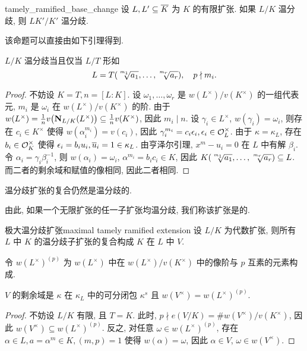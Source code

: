 \begin{proposition}{}{tamely_ramified_base_change}
设 $L,L'\subseteq \overline K$ 为 $K$ 的有限扩张. 如果 $L/K$ 温分歧, 则 $LK'/K'$ 温分歧. 
\end{proposition}

该命题可以直接由如下引理得到.

\begin{lemma}{}{}
$L/K$ 温分歧当且仅当 $L/T$ 形如
  \[L=T(\sqrt[\uproot{4}m_1]{a_1},\dots,\sqrt[\uproot{4}m_r]{a_r}),\quad p\nmid m_i.\]
\end{lemma}
\begin{proof}
不妨设 $K=T,n=[L:K]$. 设 $\omega_1,\dots,\omega_r$ 是 $w(L^\times)/v(K^\times)$ 的一组代表元, $m_i$ 是 $\omega_i$ 在 $w(L^\times)/v(K^\times)$ 的阶. 由于 $w(L^\times)=\frac{1}{n}v\bigl({\mathbf{N}}_{L/K}(L^\times)\bigr)\subseteq\frac{1}{n} v(K^\times)$, 因此 $m_i\mid n$. 设 $\gamma_i\in L^\times$, $w(\gamma_i)=\omega_i$, 则存在 $c_i\in K^\times$ 使得 $w(\alpha_i^{m_i})=v(c_i)$, 因此 $\gamma_i^{m_i}=c_i\epsilon_i,\epsilon_i\in{\mathcal{O}}_L^\times$. 由于 $\kappa=\kappa_L$, 存在 $b_i\in {\mathcal{O}}_K^\times$ 使得 $\epsilon_i=b_i u_i,\overline u_i=1\in \kappa_L$. 由亨泽尔引理, $x^m-u_i=0$ 在 $L$ 中有解 $\beta_i$. 令 $\alpha_i=\gamma_i\beta_i^{-1}$, 则 $w(\alpha_i)=\omega_i$, $\alpha^{m_i}=b_i c_i\in K$, 因此 $K(\sqrt[\uproot{4}m_1]{a_1},\dots,\sqrt[\uproot{4}m_r]{a_r})\subseteq L$. 而二者的剩余域和赋值的像相同, 因此二者相同.
\end{proof}

\begin{corollary}{}{}
温分歧扩张的复合仍然是温分歧的.
\end{corollary}
由此, 如果一个无限扩张的任一子扩张均温分歧, 我们称该扩张是的.

\begin{definition}{极大温分歧扩张}{maximal tamely ramified extension}
设 $L/K$ 为代数扩张, 则所有 $L$ 中 $K$ 的温分歧子扩张的复合构成 $K$ 在 $L$ 中 $V$.
\end{definition}

令 $w(L^\times)^{(p)}$ 为 $w(L^\times)$ 中在 $w(L^\times)/v(K^\times)$ 中的像阶与 $p$ 互素的元素构成.
\begin{proposition}{}{}
$V$ 的剩余域是 $\kappa$ 在 $\kappa_L$ 中的可分闭包 $\kappa^s$ 且 $w(V^\times)=w(L^\times)^{(p)}$.
\end{proposition}
\begin{proof}
不妨设 $L/K$ 有限, 且 $T=K$. 此时, $p\nmid e(V/K)=\# w(V^\times)/v(K^\times)$, 因此 $w(V^\times)\subseteq w(L^\times)^{(p)}$. 反之, 对任意 $\omega\in w(L^\times)^{(p)}$, 存在 $\alpha\in L,a=\alpha^m\in K,(m,p)=1$ 使得 $w(\alpha)=\omega$, 因此 $\alpha\in V$, $\omega\in w(V^\times)$.
\end{proof}


